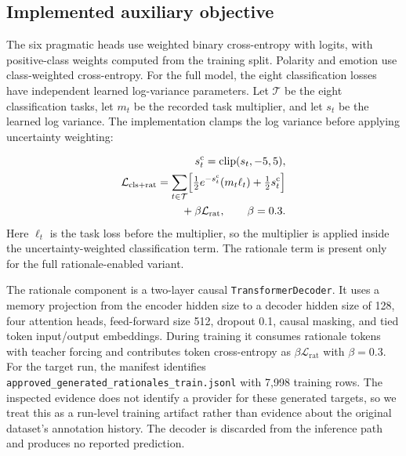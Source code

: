 \subsection{Implemented auxiliary objective}
The six pragmatic heads use weighted binary cross-entropy with logits, with positive-class weights computed from the training split. Polarity and emotion use class-weighted cross-entropy. For the full model, the eight classification losses have independent learned log-variance parameters. Let $\mathcal{T}$ be the eight classification tasks, let $m_t$ be the recorded task multiplier, and let $s_t$ be the learned log variance. The implementation clamps the log variance before applying uncertainty weighting:

\[
\begin{aligned}
s_t^{\mathrm{c}}=\operatorname{clip}(s_t,-5,5), \\
\mathcal{L}_{\mathrm{cls+rat}}=\sum_{t\in\mathcal{T}}\Bigl[\tfrac12 e^{-s_t^{\mathrm{c}}}(m_t\ell_t)+\tfrac12s_t^{\mathrm{c}}\Bigr] \\
{}+\beta\mathcal{L}_{\mathrm{rat}},\qquad \beta=0.3.
\end{aligned}
\]
Here $\ell_t$ is the task loss before the multiplier, so the multiplier is applied inside the uncertainty-weighted classification term. The rationale term is present only for the full rationale-enabled variant.

The rationale component is a two-layer causal \texttt{TransformerDecoder}. It uses a memory projection from the encoder hidden size to a decoder hidden size of 128, four attention heads, feed-forward size 512, dropout 0.1, causal masking, and tied token input/output embeddings. During training it consumes rationale tokens with teacher forcing and contributes token cross-entropy as $\beta\mathcal{L}_{\mathrm{rat}}$ with $\beta=0.3$. For the target run, the manifest identifies \texttt{approved\allowbreak{}\_generat\allowbreak{}ed\_ratio\allowbreak{}nales\_tr\allowbreak{}ain.json\allowbreak{}l} with 7,998 training rows. The inspected evidence does not identify a provider for these generated targets, so we treat this as a run-level training artifact rather than evidence about the original dataset's annotation history. The decoder is discarded from the inference path and produces no reported prediction.

